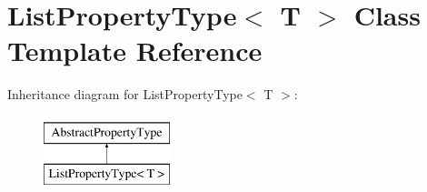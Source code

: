 \hypertarget{classListPropertyType}{\section{List\-Property\-Type$<$ T $>$ Class Template Reference}
\label{classListPropertyType}
}
Inheritance diagram for List\-Property\-Type$<$ T $>$\-:\begin{figure}[H]
\begin{center}
\leavevmode
\includegraphics[height=2.000000cm]{classListPropertyType}
\end{center}
\end{figure}
